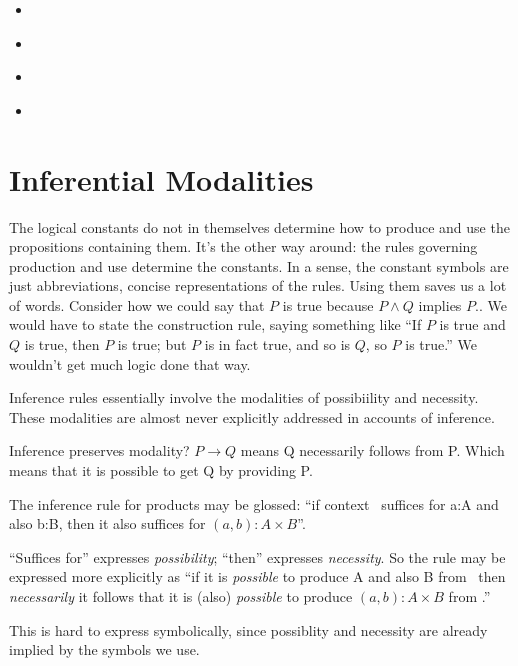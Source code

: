 \documentclass{article}
\begin{document}
\begin{itemize}
  \item {} \cite{irefinement_calc}
  \item {} \cite{back2012refinement}
  \item {} \cite{refinement_types_ml}
  \item {} \cite{morgan1990programming}
\end{itemize}


\section{Inferential Modalities}

The logical constants do not in themselves determine how to produce
and use the propositions containing them. It's the other way around:
the rules governing production and use determine the constants. In a
sense, the constant symbols are just abbreviations, concise
representations of the rules. Using them saves us a lot of words.
Consider how we could say that \(P\) is true because \(P\land Q\)
implies \(P\).. We would have to state the construction rule, saying
something like ``If \(P\) is true and \(Q\) is true, then \(P\) is
true; but \(P\) is in fact true, and so is \(Q\), so \(P\) is true.''
We wouldn't get much logic done that way.

Inference rules essentially involve the modalities of possibiility and
necessity. These modalities are almost never explicitly addressed in
accounts of inference.

Inference preserves modality? \(P\rightarrow Q\) means Q necessarily
follows from P. Which means that it is possible to get Q by
providing P.

The inference rule for products may be glossed: ``if
context \ContextG\ suffices for a:A and also b:B, then it also suffices for \( (a,b):A\times B\)''.

``Suffices for'' expresses \textit{possibility}; ``then'' expresses
\textit{necessity}. So the rule may be expressed more explicitly as
``if it is \textit{possible} to produce A and also B from \Gamma\,
then \textit{necessarily} it follows that it is (also)
\textit{possible} to produce \( (a,b):A\times B \) from \Gamma.''

This is hard to express symbolically, since possiblity and necessity
are already implied by the symbols we use.
\end{document}
